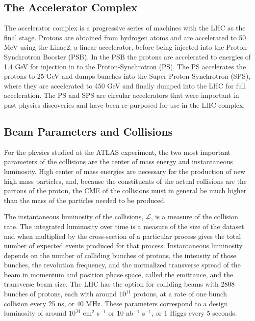 \subsection{The Accelerator Complex}

The accelerator complex is a progressive series of machines with the LHC as the final stage.
Protons are obtained from hydrogen atoms and are accelerated to 50 MeV using the
Linac2, a linear accelerator, before being injected into the Proton-Synchrotron Booster (PSB). In
the PSB the protons are accelerated to energies of 1.4 GeV for injection
in to the Proton-Synchrotron (PS). The PS accelerates the protons to 25 GeV
and dumps bunches into the Super Proton Synchrotron (SPS), where they 
are accelerated to 450 GeV and finally dumped into the LHC for full acceleration. The PS and SPS are circular accelerators
that were important in past physics discoveries and have been re-purposed for use in the LHC complex. 

\subsection{Beam Parameters and Collisions} 

For the physics studied at the ATLAS experiment, the two most important parameters of
the collisions are the center of mass energy and instantaneous luminosity.
High center of mass energies are necessary for the production
of new high mass particles, and, because the constituents of the actual collisions
are the partons of the proton, the CME of the collisions must in general
be much higher than the mass of the particles needed to be produced. 

The instantaneous luminosity of the collisions, $\mathcal{L}$, is a measure of the
collision rate. The integrated luminosity over time is a measure of the size
of the dataset and when multiplied by the cross-section of a particular process
gives the total number of expected events produced for that process.
Instantaneous luminosity depends on the number of colliding bunches of protons,
the intensity of those bunches, the revolution
frequency, and the normalized transverse spread of the beam in momentum and position
phase space, called the emittance, and the transverse beam size. The LHC has the
option for colliding beams with 2808 bunches of protons, each with around $10^{11}$ protons,
at a rate of one bunch collision every 25 ns, or 40 MHz. These parameters correspond
to a design luminosity of around $10^34$ cm$^{2}$ s$^{-1}$ or 10 nb$^{-1}$ s$^{-1}$,
or 1 Higgs every 5 seconds.    

